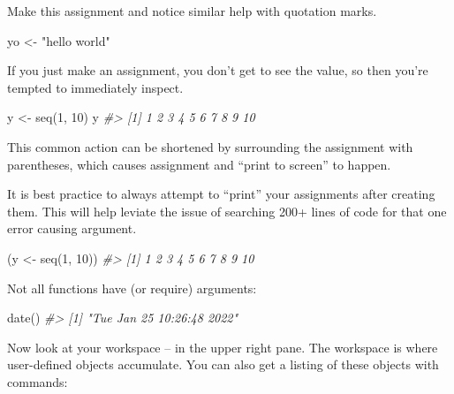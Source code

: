 \documentclass[
]{book}
\newenvironment{Shaded}{\begin{snugshade}}{\end{snugshade}}
\newcommand{\CommentTok}[1]{\textcolor[rgb]{0.56,0.35,0.01}{\textit{#1}}}
\newcommand{\DecValTok}[1]{\textcolor[rgb]{0.00,0.00,0.81}{#1}}
\newcommand{\FunctionTok}[1]{\textcolor[rgb]{0.00,0.00,0.00}{#1}}
\newcommand{\NormalTok}[1]{#1}
\newcommand{\OtherTok}[1]{\textcolor[rgb]{0.56,0.35,0.01}{#1}}
\newcommand{\StringTok}[1]{\textcolor[rgb]{0.31,0.60,0.02}{#1}}
\begin{document}
Make this assignment and notice similar help with quotation marks.

\begin{Shaded}
\begin{Highlighting}[]
\NormalTok{yo }\OtherTok{\textless{}{-}} \StringTok{"hello world"}
\end{Highlighting}
\end{Shaded}

If you just make an assignment, you don't get to see the value, so then you're tempted to immediately inspect.

\begin{Shaded}
\begin{Highlighting}[]
\NormalTok{y }\OtherTok{\textless{}{-}} \FunctionTok{seq}\NormalTok{(}\DecValTok{1}\NormalTok{, }\DecValTok{10}\NormalTok{)}
\NormalTok{y}
\CommentTok{\#\textgreater{}  [1]  1  2  3  4  5  6  7  8  9 10}
\end{Highlighting}
\end{Shaded}

This common action can be shortened by surrounding the assignment with parentheses, which causes assignment and ``print to screen'' to happen.

It is best practice to always attempt to ``print'' your assignments after creating them. This will help leviate the issue of searching 200+ lines of code for that one error causing argument.

\begin{Shaded}
\begin{Highlighting}[]
\NormalTok{(y }\OtherTok{\textless{}{-}} \FunctionTok{seq}\NormalTok{(}\DecValTok{1}\NormalTok{, }\DecValTok{10}\NormalTok{))}
\CommentTok{\#\textgreater{}  [1]  1  2  3  4  5  6  7  8  9 10}
\end{Highlighting}
\end{Shaded}

Not all functions have (or require) arguments:

\begin{Shaded}
\begin{Highlighting}[]
\FunctionTok{date}\NormalTok{()}
\CommentTok{\#\textgreater{} [1] "Tue Jan 25 10:26:48 2022"}
\end{Highlighting}
\end{Shaded}

Now look at your workspace -- in the upper right pane. The workspace is where user-defined objects accumulate. You can also get a listing of these objects with commands:
\end{document}
